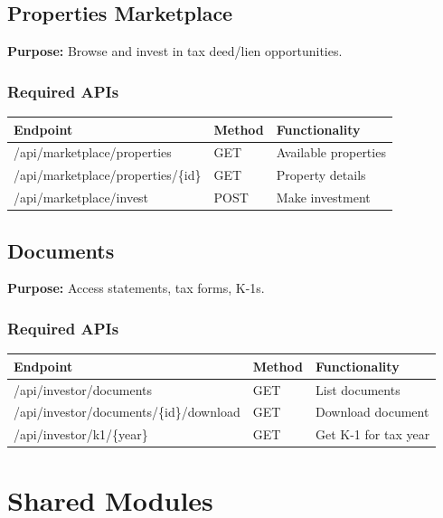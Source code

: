 \documentclass[11pt,a4paper]{article}
\begin{document}
\subsection{Properties Marketplace}

\textbf{Purpose:} Browse and invest in tax deed/lien opportunities.

\subsubsection{Required APIs}

\begin{longtable}{|p{5cm}|p{2cm}|p{6cm}|}
\hline
\textbf{Endpoint} & \textbf{Method} & \textbf{Functionality} \\
\hline
/api/marketplace/properties & GET & Available properties \\
/api/marketplace/properties/\{id\} & GET & Property details \\
/api/marketplace/invest & POST & Make investment \\
\hline
\end{longtable}

\subsection{Documents}

\textbf{Purpose:} Access statements, tax forms, K-1s.

\subsubsection{Required APIs}

\begin{longtable}{|p{5cm}|p{2cm}|p{6cm}|}
\hline
\textbf{Endpoint} & \textbf{Method} & \textbf{Functionality} \\
\hline
/api/investor/documents & GET & List documents \\
/api/investor/documents/\{id\}/download & GET & Download document \\
/api/investor/k1/\{year\} & GET & Get K-1 for tax year \\
\hline
\end{longtable}

\newpage

\section{Shared Modules}
\end{document}
